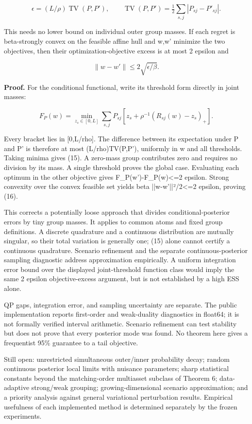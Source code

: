 \documentclass[10pt]{article}
\begin{document}
\begin{equation}
\epsilon=(L/\rho)\operatorname{TV}(P,P'),\qquad
\operatorname{TV}(P,P')=\tfrac12\sum_{s,j}|P_{sj}-P'_{sj}|.\tag{15}
\end{equation}



This needs no lower bound on individual outer group masses. If each regret is beta-strongly convex on the feasible affine hull and w,w' minimize the two objectives, then their optimization-objective excess is at most 2 epsilon and

\begin{equation}
\|w-w'\|\le 2\sqrt{\epsilon/\beta}.\tag{16}
\end{equation}



\textbf{Proof.} For the conditional functional, write its threshold form directly in joint masses:

\[
F_P(w)=\min_{z_s\in[0,L]}\sum_{s,j}P_{sj}
\left[z_s+\rho^{-1}(R_{sj}(w)-z_s)_+\right].
\]



Every bracket lies in [0,L/rho]. The difference between its expectation under P and P' is therefore at most (L/rho)TV(P,P'), uniformly in w and all thresholds. Taking minima gives (15). A zero-mass group contributes zero and requires no division by its mass. A single threshold proves the global case. Evaluating each optimum in the other objective gives F\_P(w')-F\_P(w)<=2 epsilon. Strong convexity over the convex feasible set yields beta ||w-w'||²/2<=2 epsilon, proving (16).

This corrects a potentially loose approach that divides conditional-posterior errors by tiny group masses. It applies to common atoms and fixed group definitions. A discrete quadrature and a continuous distribution are mutually singular, so their total variation is generally one; (15) alone cannot certify a continuous quadrature. Scenario refinement and the separate continuous-posterior sampling diagnostic address approximation empirically. A uniform integration error bound over the displayed joint-threshold function class would imply the same 2 epsilon objective-excess argument, but is not established by a high ESS alone.

QP gaps, integration error, and sampling uncertainty are separate. The public implementation reports first-order and weak-duality diagnostics in float64; it is not formally verified interval arithmetic. Scenario refinement can test stability but does not prove that every posterior mode was found. No theorem here gives a frequentist 95\% guarantee to a tail objective.

Still open: unrestricted simultaneous outer/inner probability decay; random continuous posterior local limits with nuisance parameters; sharp statistical constants beyond the matching-order multiasset subclass of Theorem 6; data-adaptive strong/weak grouping; growing-dimensional scenario approximation; and a priority analysis against general variational perturbation results. Empirical usefulness of each implemented method is determined separately by the frozen experiments.
\end{document}
